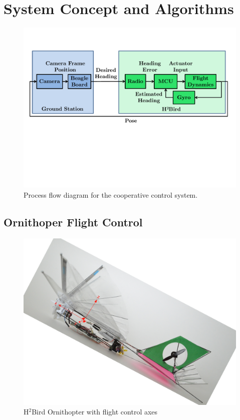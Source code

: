 \documentclass[letterpaper, 10 pt, conference]{ieeeconf}
\begin{document}

\section{System Concept and Algorithms}

\begin{figure}[tb]
\centering
\includegraphics[width=\linewidth]{figures/process_flow.pdf}
\caption{Process flow diagram for the cooperative control system.}
\label{fig:process_flow}
\end{figure}

\subsection{Ornithoper Flight Control}

\begin{figure}[tb]
\centering
\includegraphics[width=\linewidth]{figures/h2bird_axes.jpg}
\caption{H$^2$Bird Ornithopter with flight control axes}
\label{fig:h2Bird_axes}
\end{figure}
\end{document}
